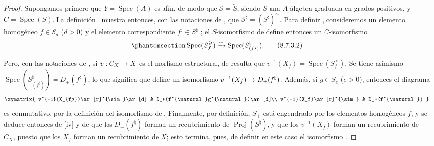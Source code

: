 \documentclass[oneside,10pt]{amsart}
\makeatletter
\newcommand{\ega@arrow}[2]{\mathchoice{#1}{#2}{#2}{#2}}
\renewcommand{\to}{\ega@arrow{\longrightarrow}{\rightarrow}}
\newcommand{\oldpage}[2][]{\marginnote{\normalfont\footnotesize\textbf{#1}~|~#2}\ignorespaces}
\let\EGAOriginalLabel\label
\renewcommand{\label}[1]{\phantomsection\EGAOriginalLabel{#1}}
\makeatother
\begin{document}
\begin{proof}
Supongamos primero que $Y=\operatorname{Spec}(A)$ es afín, de modo que $\mathcal{S}=\widetilde{S}$, siendo $S$ una $A$-álgebra graduada en grados positivos, y $C=\operatorname{Spec}(S)$.
La definición~ muestra entonces, con las notaciones de , que $\mathcal{S}^{\natural}=(S^{\natural})^{\sim}$.
Para definir , consideremos un elemento homogéneo $f\in S_d$ ($d>0$) y el elemento correspondiente $f^{\natural}\in S^{\natural}$ ;
el $S$-isomorfismo de  define entonces un $C$-isomorfismo
\begin{equation}
\label{II.8.7.3.2-fr}
  \operatorname{Spec}(S_f^{\geqslant})
  \xrightarrow{\sim}
  \operatorname{Spec}(S_{(f^{\natural})}^{\natural}).
\tag{8.7.3.2}
\end{equation}

\oldpage[II]{175}
Pero, con las notaciones de , si $v:C_X\to X$ es el morfismo estructural, de  resulta que $v^{-1}(X_f)=\operatorname{Spec}(S_f^{\geqslant})$.
Se tiene asimismo $\operatorname{Spec}(S_{(f^{\natural})}^{\natural})=D_+(f^{\natural})$, lo que significa que  define un isomorfismo $v^{-1}(X_f)\to D_+(f^{\natural})$.
Además, si $g\in S_e$ ($e>0$), entonces el diagrama
\[
  \xymatrix{
    v^{-1}(X_{fg})\ar[r]^{\sim}\ar[d] &
    D_+(f^{\natural}g^{\natural})\ar[d]\\
    v^{-1}(X_f)\ar[r]^{\sim} & D_+(f^{\natural})
  }
\]
es conmutativo, por la definición del isomorfismo de .
Finalmente, por definición, $S_+$ está engendrado por los elementos homogéneos $f$, y se deduce entonces de [iv] y de  que los $D_+(f^{\natural})$ forman un recubrimiento de $\operatorname{Proj}(S^{\natural})$, y que los $v^{-1}(X_f)$ forman un recubrimiento de $C_X$, puesto que los $X_f$ forman un recubrimiento de $X$;
esto termina, pues, de definir en este caso el isomorfismo .


\end{proof}
\end{document}
